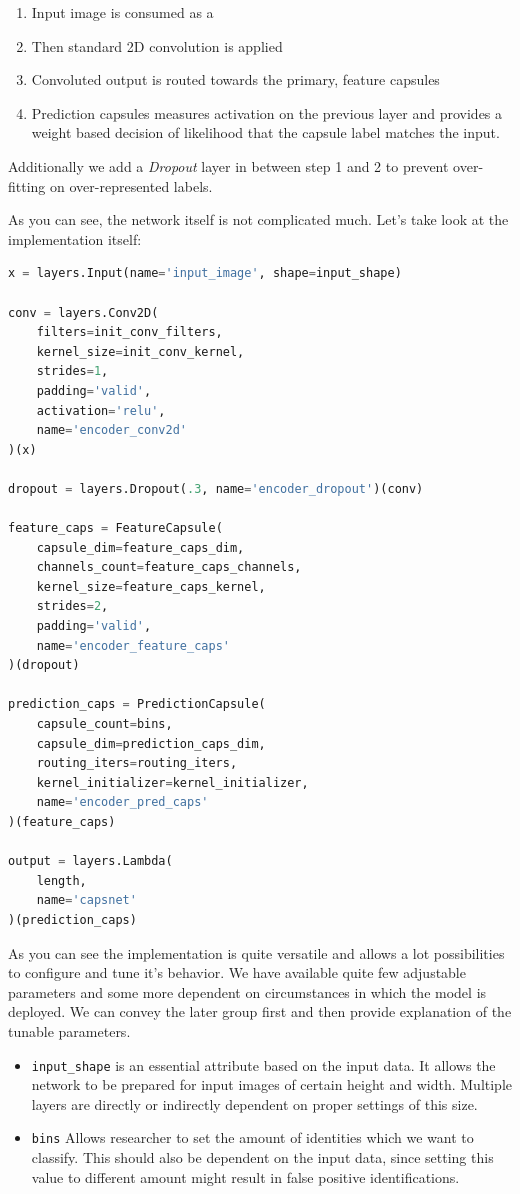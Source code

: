 \begin{enumerate}
    \item Input image is consumed as a
    \item Then standard 2D convolution is applied
    \item Convoluted output is routed towards the primary, feature capsules
    \item Prediction capsules measures activation on the previous layer and provides a weight based decision of likelihood that the capsule label matches the input.
\end{enumerate}

Additionally we add a \textit{Dropout} layer in between step 1 and 2 to prevent over-fitting on over-represented labels.

As you can see, the network itself is not complicated much. Let's take look at the implementation itself:

\begin{lstlisting}[language=Python, caption=Features capsule with squash activation]
x = layers.Input(name='input_image', shape=input_shape)

conv = layers.Conv2D(
    filters=init_conv_filters,
    kernel_size=init_conv_kernel,
    strides=1,
    padding='valid',
    activation='relu',
    name='encoder_conv2d'
)(x)

dropout = layers.Dropout(.3, name='encoder_dropout')(conv)

feature_caps = FeatureCapsule(
    capsule_dim=feature_caps_dim,
    channels_count=feature_caps_channels,
    kernel_size=feature_caps_kernel,
    strides=2,
    padding='valid',
    name='encoder_feature_caps'
)(dropout)

prediction_caps = PredictionCapsule(
    capsule_count=bins,
    capsule_dim=prediction_caps_dim,
    routing_iters=routing_iters,
    kernel_initializer=kernel_initializer,
    name='encoder_pred_caps'
)(feature_caps)

output = layers.Lambda(
    length,
    name='capsnet'
)(prediction_caps)
\end{lstlisting}

As you can see the implementation is quite versatile and allows a lot possibilities to configure and tune it's behavior. We have available quite few adjustable parameters and some more dependent on circumstances in which the model is deployed. We can convey the later group first and then provide explanation of the tunable parameters.

\begin{itemize}
    \item \texttt{input\_shape} is an essential attribute based on the input data. It allows the network to be prepared for input images of certain height and width. Multiple layers are directly or indirectly dependent on proper settings of this size.
    \item \texttt{bins} Allows researcher to set the amount of identities which we want to classify. This should also be dependent on the input data, since setting this value to different amount might result in false positive identifications.
\end{itemize}

